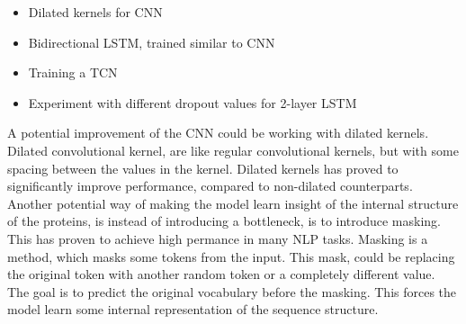 \begin{itemize}
\item Dilated kernels for CNN
\item Bidirectional LSTM, trained similar to CNN
\item Training a TCN \cite{intro}
\item Experiment with different dropout values for 2-layer LSTM
\end{itemize}

\noindent
A potential improvement of the CNN could be working with dilated kernels. Dilated convolutional kernel, are like regular convolutional kernels, but with some spacing between the values in the kernel. Dilated kernels has proved to significantly improve performance, compared to non-dilated counterparts\cite{cp}. \\

\noindent
Another potential way of making the model learn insight of the internal structure of the proteins, is instead of introducing a bottleneck, is to introduce masking. This has proven to achieve high permance in many NLP tasks\cite{BERT}. Masking is a method, which masks some tokens from the input. This mask, could be replacing the original token with another random token or a completely different value. The goal is to predict the original vocabulary before the masking. This forces the model learn some internal representation of the sequence structure.

